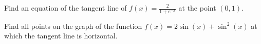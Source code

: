 \documentclass[11pt]{exam}
\begin{document}
\begin{questions}



\newpage

\question[17] 
Find an equation of the tangent line of $f(x)=\frac{2}{1+e^{-x}}$ at the point $(0,1)$.
\vfill

\addpoints
\question[17] Find all points on the graph of the function $f(x)=2\sin{(x)+\sin^{2}{(x)}}$ at which the tangent line is horizontal.

\vfill\vfill


\end{questions}
\end{document}
